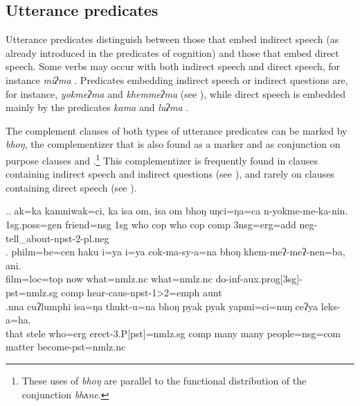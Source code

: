  
\subsection{Utterance predicates}\label{utterance-pred}

Utterance predicates distinguish between those that embed indirect speech (as already introduced in the predicates of cognition) and those that embed direct speech. Some verbs may occur with both  indirect speech and direct speech, for instance \emph{miʔma} . Predicates embedding indirect speech or indirect questions are, for instance, \emph{yokmeʔma}  and \emph{khemmeʔma}   (see \Next), while direct speech is embedded mainly by the predicates  \emph{kama}  and \emph{luʔma} . 

The complement clauses of both types of utterance predicates can be marked by \emph{bhoŋ}, the complementizer that is also found as a  marker and as conjunction on purpose clauses and  .\footnote{These uses of \emph{bhoŋ} are parallel to the functional distribution of the   conjunction \emph{bhʌne}.} This complementizer is frequently found in clauses containing indirect speech and indirect questions (see \Next), and rarely on clauses containing direct speech (see \NNext[e]).  

\ex.\ag. ak=ka kamniwak=ci,  ka isa om,  isa om bhoŋ     uŋci=ŋa=ca  n-yokme-me-ka-nin.\\
  {\sc 1sg.poss=gen} friend{\sc =nsg} {\sc 1sg} who {\sc cop} who {\sc cop} {\sc comp} {\sc 3nsg=erg=add} {\sc neg}-tell\_about-{\sc npst-2-pl.neg}\\
  
\bg. philm=be=cen       haku i=ya       i=ya           cok-ma-sy-a=na        bhoŋ khem-meʔ-meʔ-nen=ba,       ani.\\
film{\sc =loc=top}  now  what{\sc =nmlz.nc} what{\sc =nmlz.nc}  do{\sc -inf-aux.prog[3sg]-pst=nmlz.sg} {\sc comp}  hear{\sc -caus-npst-1>2=emph} aunt\\ 
 
\bg.nna  cuʔlumphi isa=ŋa   thukt-u=na bhoŋ pyak pyak yapmi=ci=nuŋ ceʔya leks-a=ha.\\
that stele who{\sc =erg} erect{\sc -3.P[pst]=nmlz.sg} {\sc comp} many many people{\sc =nsg=com} matter become{\sc [3sg]-pst=nmlz.nc}	\\
 

